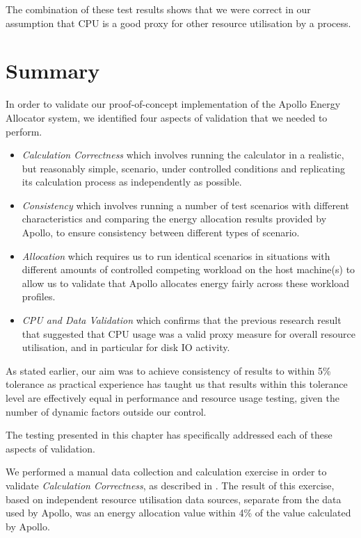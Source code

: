 The combination of these test results shows that we were correct in our assumption that CPU is a good proxy for other resource utilisation by a process.

\section{Summary}

In order to validate our proof-of-concept implementation of the Apollo Energy Allocator system, we identified four aspects of validation that we needed to perform.

\begin{itemize}
	\item \textit{Calculation Correctness} which involves running the calculator in a realistic, but reasonably simple, scenario, under controlled conditions and replicating its calculation process as independently as possible.
	\item \textit{Consistency} which involves running a number of test scenarios with different characteristics and comparing the energy allocation results provided by Apollo, to ensure consistency between different types of scenario.
	\item \textit{Allocation} which requires us to run identical scenarios in situations with different amounts of controlled competing workload on the host machine(s) to allow us to validate that Apollo allocates energy fairly across these workload profiles.
	\item \textit{CPU and Data Validation} which confirms that the previous research result that suggested that CPU usage was a valid proxy measure for overall resource utilisation, and in particular for disk IO activity.
\end{itemize}

As stated earlier, our aim was to achieve consistency of results to within 5\% tolerance as practical experience has taught us that results within this tolerance level are effectively equal in performance and resource usage testing, given the number of dynamic factors outside our control.

The testing presented in this chapter has specifically addressed each of these aspects of validation.

We performed a manual data collection and calculation exercise in order to validate \textit{Calculation Correctness}, as described in .  The result of this exercise, based on independent resource utilisation data sources, separate from the data used by Apollo, was an energy allocation value within 4\%  of the value calculated by Apollo.


